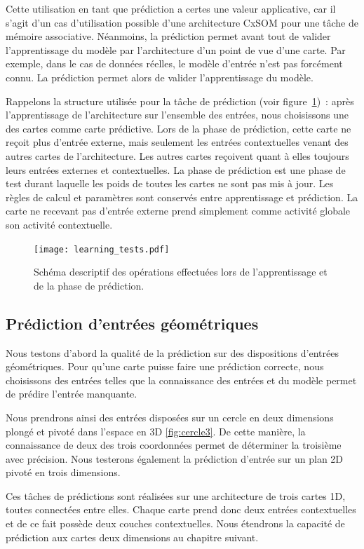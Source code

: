 \documentclass[../main]{subfiles}
\begin{document}
Cette utilisation en tant que prédiction a certes une valeur applicative, car il s'agit d'un cas d'utilisation possible d'une architecture CxSOM pour une tâche de mémoire associative. Néanmoins, la prédiction permet avant tout de valider l'apprentissage du modèle par l'architecture d'un point de vue d'une carte. Par exemple, dans le cas de données réelles, le modèle d'entrée n'est pas forcément connu. La prédiction permet alors de valider l'apprentissage du modèle.

Rappelons la structure utilisée pour la tâche de prédiction (voir figure~\ref{fig:schema_pred})~: après l'apprentissage de l'architecture sur l'ensemble des entrées, nous choisissons une des cartes comme carte prédictive. 
Lors de la phase de prédiction, cette carte ne reçoit plus d'entrée externe, mais seulement les entrées contextuelles venant des autres cartes de l'architecture. 
Les autres cartes reçoivent quant à elles toujours leurs entrées externes et contextuelles. La phase de prédiction est une phase de test durant laquelle les poids de toutes les cartes ne sont pas mis à jour. Les règles de calcul et paramètres sont conservés entre apprentissage et prédiction. La carte ne recevant pas d'entrée externe prend simplement comme activité globale son activité contextuelle. 

\begin{figure}
	\texttt{[image: learning\_tests.pdf]}
	\caption{Schéma descriptif des opérations effectuées lors de l'apprentissage et de la phase de prédiction.\label{fig:schema_pred}}
\end{figure}


\subsection{Prédiction d'entrées géométriques}

Nous testons d'abord la qualité de la prédiction sur des dispositions d'entrées géométriques.
Pour qu'une carte puisse faire une prédiction correcte, nous choisissons des entrées telles que la connaissance des entrées et du modèle permet de prédire l'entrée manquante.

Nous prendrons ainsi des entrées disposées sur un cercle en deux dimensions plongé et pivoté dans l'espace en 3D \ref{fig:cercle3}. De cette manière, la connaissance de deux des trois coordonnées permet de déterminer la troisième avec précision. Nous testerons également la prédiction d'entrée sur un plan 2D pivoté en trois dimensions.

Ces tâches de prédictions sont réalisées sur une architecture de trois cartes 1D, toutes connectées entre elles. Chaque carte prend donc deux entrées contextuelles et de ce fait possède deux couches contextuelles.
Nous étendrons la capacité de prédiction aux cartes deux dimensions au chapitre suivant.
\end{document}
